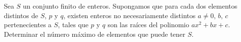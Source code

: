Sea $S$ un conjunto finito de enteros. Supongamos que para cada dos elementos distintos de $S$, $p$ y $q$, existen enteros no necesariamente distintos $a \neq 0$, $b$, $c$ pertenecientes a $S$, tales que $p$ y $q$ son las raíces del polinomio $ax^{2}+bx+c$. Determinar el número máximo de elementos que puede tener $S$.
